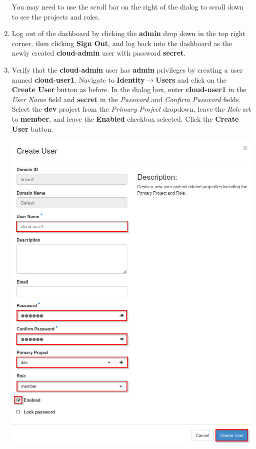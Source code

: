 \documentclass[letterpaper, 12pt]{article}
\begin{document}
\begin{enumerate}
    \begin{tipbox}{}
        You may need to use the scroll bar on the right of the dialog to scroll down to see the projects and roles.
    \end{tipbox}

    \item Log out of the dashboard by clicking the \textbf{admin} drop down in the top right corner, then clicking
    \textbf{Sign Out}, and log back into the dashboard as the newly created \textbf{cloud-admin} user with password
    \textbf{secret}.

    \item Verify that the \textbf{cloud-admin} user has \textbf{admin} privileges by creating a user named
    \textbf{cloud-user1}. Navigate to \textbf{Identity$\rightarrow$Users} and click on the \textbf{Create User} button
    as before. In the dialog box, enter \textbf{cloud-user1} in the \textit{User Name} field and \textbf{secret} in the
    \textit{Password} and \textit{Confirm Password} fields. Select the \textbf{dev} project from the \textit{Primary
    Project} dropdown, leave the \textit{Role} set to \textbf{member}, and leave the \textbf{Enabled} checkbox
    selected. Click the \textbf{Create User} button.

    \begin{center}
        \includegraphics[width=\linewidth]{images/part5/step5.png}
    \end{center}


\end{enumerate}
\end{document}

